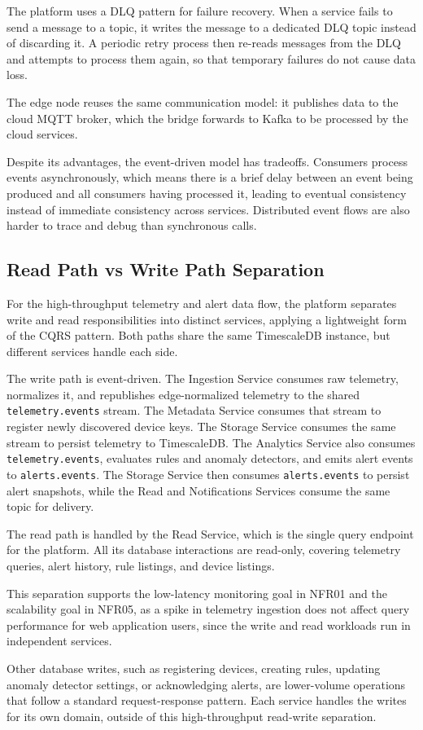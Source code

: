 The platform uses a \gls{DLQ} pattern for failure recovery. When a service fails to send a message to a topic, it writes the message to a dedicated \gls{DLQ} topic instead of discarding it. A periodic retry process then re-reads messages from the \gls{DLQ} and attempts to process them again, so that temporary failures do not cause data loss.

The edge node reuses the same communication model: it publishes data to the cloud \gls{MQTT} broker, which the bridge forwards to Kafka to be processed by the cloud services.

Despite its advantages, the event-driven model has tradeoffs. Consumers process events asynchronously, which means there is a brief delay between an event being produced and all consumers having processed it, leading to eventual consistency instead of immediate consistency across services. Distributed event flows are also harder to trace and debug than synchronous calls.

\subsection{Read Path vs Write Path Separation}
For the high-throughput telemetry and alert data flow, the platform separates write and read responsibilities into distinct services, applying a lightweight form of the \gls{CQRS} pattern. Both paths share the same TimescaleDB instance, but different services handle each side.

The write path is event-driven. The Ingestion Service consumes raw telemetry, normalizes it, and republishes edge-normalized telemetry to the shared \texttt{telemetry.events} stream. The Metadata Service consumes that stream to register newly discovered device keys. The Storage Service consumes the same stream to persist telemetry to TimescaleDB. The Analytics Service also consumes \texttt{telemetry.events}, evaluates rules and anomaly detectors, and emits alert events to \texttt{alerts.events}. The Storage Service then consumes \texttt{alerts.events} to persist alert snapshots, while the Read and Notifications Services consume the same topic for delivery.

The read path is handled by the Read Service, which is the single query endpoint for the platform. All its database interactions are read-only, covering telemetry queries, alert history, rule listings, and device listings.

This separation supports the low-latency monitoring goal in NFR01 and the scalability goal in NFR05, as a spike in telemetry ingestion does not affect query performance for web application users, since the write and read workloads run in independent services.

Other database writes, such as registering devices, creating rules, updating anomaly detector settings, or acknowledging alerts, are lower-volume operations that follow a standard request-response pattern. Each service handles the writes for its own domain, outside of this high-throughput read-write separation.
